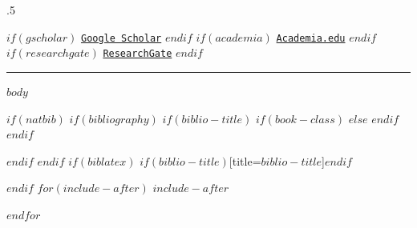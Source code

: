 \moveleft.5\hoffset\centerline{ $if(gscholar)$\aiGoogleScholar \hspace{1 mm} \href{https://scholar.google.com/citations?user=$gscholar$}{\tt Google Scholar} \hspace{3 mm} $endif$ $if(academia)$\aiAcademiaSquare \hspace{1 mm} \href{https://$academia$}{\tt Academia.edu} \hspace{3 mm} $endif$ $if(researchgate)$\aiResearchGateSquare \hspace{1 mm} \href{https://www.researchgate.net/profile/$researchgate$}{\tt ResearchGate} \hspace{1 mm} $endif$}



\vspace{2 mm}

\hrule



$body$

$if(natbib)$
$if(bibliography)$
$if(biblio-title)$
$if(book-class)$
\renewcommand\bibname{$biblio-title$}
$else$
\renewcommand\refname{$biblio-title$}
$endif$
$endif$


$endif$
$endif$
$if(biblatex)$
\printbibliography$if(biblio-title)$[title=$biblio-title$]$endif$

$endif$
$for(include-after)$
$include-after$

$endfor$

